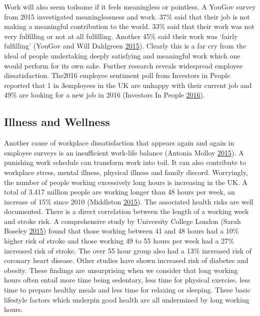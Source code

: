 \documentclass[]{tufte-handout}
\begin{document}
Work will also seem toilsome if it feels meaningless or pointless. A
YouGov survey from 2015 investigated meaninglessness and work. 37\% said
that their job is not making a meaningful contribution to the world.
33\% said that their work was not very fulfilling or not at all
fulfilling. Another 45\% said their work was `fairly fulfilling' (YouGov
and Will Dahlgreen \protect\hyperlink{ref-YouGov2015}{2015}). Clearly
this is a far cry from the ideal of people undertaking deeply satisfying
and meaningful work which one would perform for its own sake. Further
research reveals widespread employee dissatisfaction. The2016 employee
sentiment poll from Investors in People reported that 1 in 3employees in
the UK are unhappy with their current job and 49\% are looking for a new
job in 2016 (Investors In People
\protect\hyperlink{ref-InvestorsinPeopleHQ2016}{2016}).

\hypertarget{illness-and-wellness}{%
\subsection{Illness and Wellness}\label{illness-and-wellness}}

Another cause of workplace dissatisfaction that appears again and again
in employee surveys is an insufficient work-life balance (Antonia Molloy
\protect\hyperlink{ref-AntoniaMolloy2015}{2015}). A punishing work
schedule can transform work into toil. It can also contribute to
workplace stress, mental illness, physical illness and family discord.
Worryingly, the number of people working excessively long hours is
increasing in the UK. A total of 3.417 million people are working longer
than 48 hours per week, an increase of 15\% since 2010 (Middleton
\protect\hyperlink{ref-RachelMiddleton2015}{2015}). The associated
health risks are well documented. There is a direct correlation between
the length of a working week and stroke risk. A comprehensive study by
University College London (Sarah Boseley
\protect\hyperlink{ref-SarahBoseley2015}{2015}) found that those working
between 41 and 48 hours had a 10\% higher risk of stroke and those
working 49 to 55 hours per week had a 27\% increased risk of stroke. The
over 55 hour group also had a 13\% increased risk of coronary heart
disease. Other studies have shown increased risk of diabetes and
obesity. These findings are unsurprising when we consider that long
working hours often entail more time being sedentary, less time for
physical exercise, less time to prepare healthy meals and less time for
relaxing or sleeping. These basic lifestyle factors which underpin good
health are all undermined by long working hours.
\end{document}
